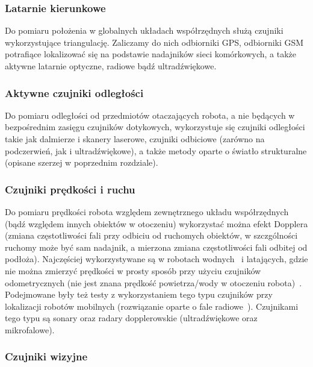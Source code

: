 \subsubsection{Latarnie kierunkowe}

Do pomiaru położenia w globalnych układach współrzędnych służą czujniki
wykorzystujące triangulację. Zaliczamy do nich odbiorniki GPS, odbiorniki GSM
potrafiące lokalizować się na podstawie nadajników sieci komórkowych, a także
aktywne latarnie optyczne, radiowe bądź ultradźwiękowe.

\subsubsection{Aktywne czujniki odległości}

Do pomiaru odległości od przedmiotów otaczających robota, a nie będących
w bezpośrednim zasięgu czujników dotykowych, wykorzystuje się czujniki odległości
takie jak dalmierze i skanery laserowe, czujniki odbiciowe (zarówno na podczerwień,
jak i ultradźwiękowe), a także metody oparte o światło strukturalne (opisane szerzej
w poprzednim rozdziale).

\subsubsection{Czujniki prędkości i ruchu}

Do pomiaru prędkości robota względem zewnętrznego układu współrzędnych (bądź
względem innych obiektów w otoczeniu) wykorzystać można efekt Dopplera (zmiana
częstotliwości fali przy odbiciu od ruchomych obiektów, w szczgólności ruchomy
może być sam nadajnik, a mierzona zmiana częstotliwości fali odbitej od podłoża).
Najczęściej wykorzystywane są w robotach wodnych~\cite{doppler_underwater} i latających, gdzie nie
można zmierzyć prędkości w prosty sposób przy użyciu czujników odometrycznych
(nie jest znana prędkość powietrza/wody w otoczeniu robota)~\cite{whereami}.
Podejmowane były też testy z wykorzystaniem tego typu czujników przy lokalizacji
robotów mobilnych (rozwiązanie oparte o fale radiowe~\cite{doppler_mobilesensor}).
Czujnikami tego typu są sonary oraz radary dopplerowskie (ultradźwiękowe
oraz mikrofalowe).

\subsubsection{Czujniki wizyjne}

